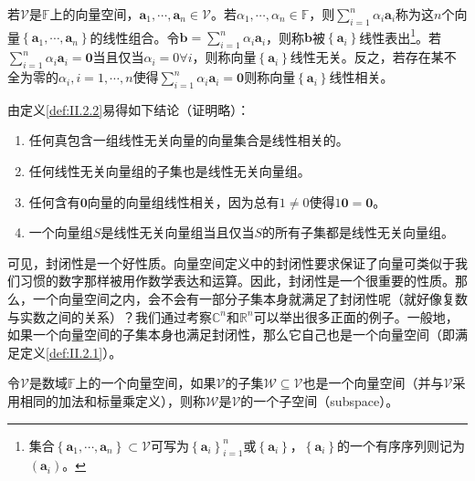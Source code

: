 \documentclass[main.tex]{subfiles}
\begin{document}
\begin{definition}\label{def:II.2.2}
若$\mathcal{V}$是$\mathbb{F}$上的向量空间，$\mathbf{a}_1,\cdots,\mathbf{a}_n\in\mathcal{V}$。若$\alpha_1,\cdots,\alpha_n\in\mathbb{F}$，则$\sum_{i=1}^n\alpha_i\mathbf{a}_i$称为这$n$个向量$\left\{\mathbf{a}_1,\cdots,\mathbf{a}_n\right\}$的线性组合。令$\mathbf{b}=\sum_{i=1}^n\alpha_i\mathbf{a}_i$，则称$\mathbf{b}$被$\left\{\mathbf{a}_i\right\}$线性表出\footnote{集合$\left\{\mathbf{a}_1,\cdots,\mathbf{a}_n\right\}\subset\mathcal{V}$可写为$\left\{\mathbf{a}_i\right\}_{i=1}^n$或$\left\{\mathbf{a}_i\right\}$，$\left\{\mathbf{a}_i\right\}$的一个有序序列则记为$\left(\mathbf{a}_i\right)$。}。若$\sum_{i=1}^n\alpha_i\mathbf{a}_i=\bm{0}$当且仅当$\alpha_i=0\forall i$，则称向量$\left\{\mathbf{a}_i\right\}$线性无关。反之，若存在某不全为零的$\alpha_i,i=1,\cdots,n$使得$\sum_{i=1}^n\alpha_i\mathbf{a}_i=\bm{0}$则称向量$\left\{\mathbf{a}_i\right\}$线性相关。
\end{definition}

由定义\ref{def:II.2.2}易得如下结论（证明略）：
\begin{enumerate}
    \item 任何真包含一组线性无关向量的向量集合是线性相关的\cite[定理3.1、3.2, p.~98]{周胜林2012线性代数}。
    \item 任何线性无关向量组的子集也是线性无关向量组\cite[\S7.2“(2)”,p.~171]{周胜林2012线性代数}。
    \item 任何含有$\mathbf{0}$向量的向量组线性相关，因为总有$1\neq 0$使得$1\mathbf{0}=\mathbf{0}$。
    \item 一个向量组$S$是线性无关向量组当且仅当$S$的所有子集都是线性无关向量组。
\end{enumerate}

可见，封闭性是一个好性质。向量空间定义中的封闭性要求保证了向量可类似于我们习惯的数字那样被用作数学表达和运算。因此，封闭性是一个很重要的性质。那么，一个向量空间之内，会不会有一部分子集本身就满足了封闭性呢（就好像复数与实数之间的关系）？我们通过考察$\mathbb{C}^n$和$\mathbb{R}^n$可以举出很多正面的例子。一般地，如果一个向量空间的子集本身也满足封闭性，那么它自己也是一个向量空间（即满足定义\ref{def:II.2.1}）。

\begin{definition}[子空间]\label{def:II.2.3}
令$\mathcal{V}$是数域$\mathbb{F}$上的一个向量空间，如果$\mathcal{V}$的子集$\mathcal{W}\subseteq\mathcal{V}$也是一个向量空间（并与$\mathcal{V}$采用相同的加法和标量乘定义），则称$\mathcal{W}$是$\mathcal{V}$的一个子空间（subspace）。
\end{definition}
\end{document}
